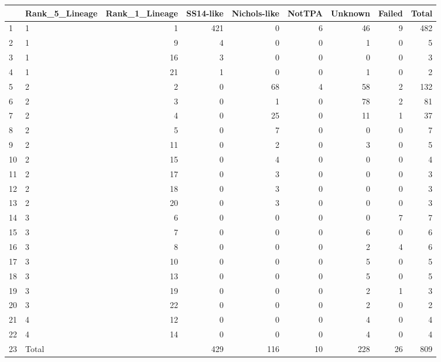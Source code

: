 \begin{table}[ht]
\centering
\begin{tabular}{llrrrrrrr}
  \hline
 & Rank\_5\_Lineage & Rank\_1\_Lineage & SS14-like & Nichols-like & NotTPA & Unknown & Failed & Total \\ 
  \hline
1 & 1 & 1 & 421 & 0 & 6 & 46 & 9 & 482 \\ 
  2 & 1 & 9 & 4 & 0 & 0 & 1 & 0 & 5 \\ 
  3 & 1 & 16 & 3 & 0 & 0 & 0 & 0 & 3 \\ 
  4 & 1 & 21 & 1 & 0 & 0 & 1 & 0 & 2 \\ 
  5 & 2 & 2 & 0 & 68 & 4 & 58 & 2 & 132 \\ 
  6 & 2 & 3 & 0 & 1 & 0 & 78 & 2 & 81 \\ 
  7 & 2 & 4 & 0 & 25 & 0 & 11 & 1 & 37 \\ 
  8 & 2 & 5 & 0 & 7 & 0 & 0 & 0 & 7 \\ 
  9 & 2 & 11 & 0 & 2 & 0 & 3 & 0 & 5 \\ 
  10 & 2 & 15 & 0 & 4 & 0 & 0 & 0 & 4 \\ 
  11 & 2 & 17 & 0 & 3 & 0 & 0 & 0 & 3 \\ 
  12 & 2 & 18 & 0 & 3 & 0 & 0 & 0 & 3 \\ 
  13 & 2 & 20 & 0 & 3 & 0 & 0 & 0 & 3 \\ 
  14 & 3 & 6 & 0 & 0 & 0 & 0 & 7 & 7 \\ 
  15 & 3 & 7 & 0 & 0 & 0 & 6 & 0 & 6 \\ 
  16 & 3 & 8 & 0 & 0 & 0 & 2 & 4 & 6 \\ 
  17 & 3 & 10 & 0 & 0 & 0 & 5 & 0 & 5 \\ 
  18 & 3 & 13 & 0 & 0 & 0 & 5 & 0 & 5 \\ 
  19 & 3 & 19 & 0 & 0 & 0 & 2 & 1 & 3 \\ 
  20 & 3 & 22 & 0 & 0 & 0 & 2 & 0 & 2 \\ 
  21 & 4 & 12 & 0 & 0 & 0 & 4 & 0 & 4 \\ 
  22 & 4 & 14 & 0 & 0 & 0 & 4 & 0 & 4 \\ 
  23 & Total &  & 429 & 116 & 10 & 228 & 26 & 809 \\ 
   \hline
\end{tabular}
\end{table}
